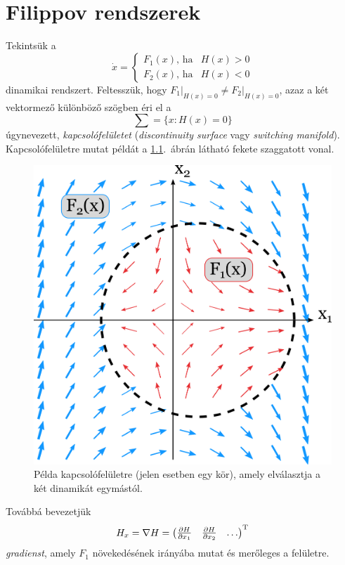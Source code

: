 \chapter{\label{sec:filippov}Filippov rendszerek}


Tekintsük a
%
\begin{equation}
\dot{x}=\left\{
\begin{matrix}
F_1(x), \, \mathrm{ha} & H(x) > 0\\
F_2(x), \, \mathrm{ha} & H(x) < 0
\end{matrix}
\right.
\end{equation}
%
\noindent dinamikai rendszert. Feltesszük, hogy 
$\left.F_1\right|_{H(x)=0} \neq \left.F_2\right|_{H(x)=0}$,
azaz a két vektormező különböző szögben éri el a 
%
\begin{equation}
\sum=\{x:H(x)=0\}
\end{equation}
%
\noindent úgynevezett, \emph{kapcsolófelületet}  (\textit{discontinuity surface} vagy \textit{switching manifold}). Kapcsolófelületre mutat példát a \ref{fig:kapcsolofelulet}.~ábrán látható fekete szaggatott vonal.

\begin{figure}[!h]
\centering
\includegraphics[width=0.5 \textwidth]{graphics/discontinuity_surface_fancy.png}
\caption{Példa kapcsolófelületre (jelen esetben egy kör), amely elválasztja a két dinamikát egymástól.}
\label{fig:kapcsolofelulet}
\end{figure}

Továbbá bevezetjük
%
\begin{equation}
H_x=\nabla H=\begin{pmatrix}
\frac{\partial H}{\partial x_1}&\frac{\partial H}{\partial x_2} &\dots 
\end{pmatrix}^{\rm T}
\end{equation}
%
\noindent \emph{gradienst}, amely $F_1$ növekedésének irányába mutat és merőleges a felületre.
 
